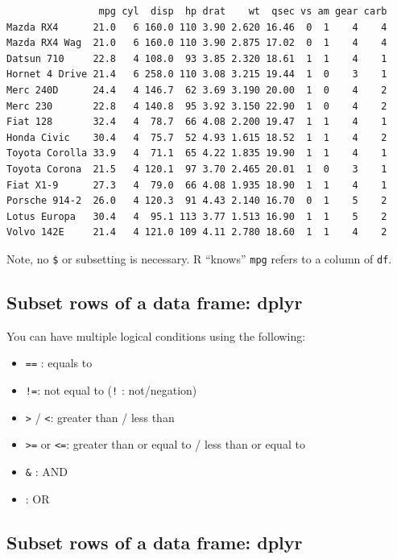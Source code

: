 \documentclass[
]{article}
\providecommand{\tightlist}{%
  \setlength{\itemsep}{0pt}\setlength{\parskip}{0pt}}
\begin{document}
\begin{verbatim}
                mpg cyl  disp  hp drat    wt  qsec vs am gear carb
Mazda RX4      21.0   6 160.0 110 3.90 2.620 16.46  0  1    4    4
Mazda RX4 Wag  21.0   6 160.0 110 3.90 2.875 17.02  0  1    4    4
Datsun 710     22.8   4 108.0  93 3.85 2.320 18.61  1  1    4    1
Hornet 4 Drive 21.4   6 258.0 110 3.08 3.215 19.44  1  0    3    1
Merc 240D      24.4   4 146.7  62 3.69 3.190 20.00  1  0    4    2
Merc 230       22.8   4 140.8  95 3.92 3.150 22.90  1  0    4    2
Fiat 128       32.4   4  78.7  66 4.08 2.200 19.47  1  1    4    1
Honda Civic    30.4   4  75.7  52 4.93 1.615 18.52  1  1    4    2
Toyota Corolla 33.9   4  71.1  65 4.22 1.835 19.90  1  1    4    1
Toyota Corona  21.5   4 120.1  97 3.70 2.465 20.01  1  0    3    1
Fiat X1-9      27.3   4  79.0  66 4.08 1.935 18.90  1  1    4    1
Porsche 914-2  26.0   4 120.3  91 4.43 2.140 16.70  0  1    5    2
Lotus Europa   30.4   4  95.1 113 3.77 1.513 16.90  1  1    5    2
Volvo 142E     21.4   4 121.0 109 4.11 2.780 18.60  1  1    4    2
\end{verbatim}

Note, no \texttt{\$} or subsetting is necessary. R ``knows''
\texttt{mpg} refers to a column of \texttt{df}.

\hypertarget{subset-rows-of-a-data-frame-dplyr-1}{%
\subsection{Subset rows of a data frame:
dplyr}\label{subset-rows-of-a-data-frame-dplyr-1}}

You can have multiple logical conditions using the following:

\begin{itemize}
\tightlist
\item
  \texttt{==} : equals to
\item
  \texttt{!=}: not equal to (\texttt{!} : not/negation)
\item
  \texttt{\textgreater{}} / \texttt{\textless{}}: greater than / less
  than
\item
  \texttt{\textgreater{}=} or \texttt{\textless{}=}: greater than or
  equal to / less than or equal to
\item
  \texttt{\&} : AND
\item
  \texttt{\textbar{}} : OR
\end{itemize}

\hypertarget{subset-rows-of-a-data-frame-dplyr-2}{%
\subsection{Subset rows of a data frame:
dplyr}\label{subset-rows-of-a-data-frame-dplyr-2}}
\end{document}
